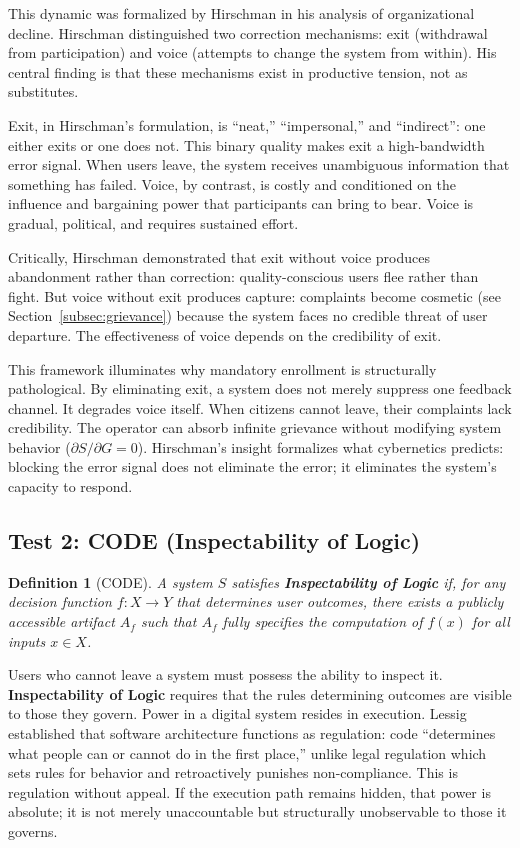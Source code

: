 \documentclass{article}
\newtheorem{definition}{Definition}[section]
\begin{document}
This dynamic was formalized by Hirschman \citep{hirschman1970} in his analysis of organizational decline. Hirschman distinguished two correction mechanisms: exit (withdrawal from participation) and voice (attempts to change the system from within). His central finding is that these mechanisms exist in productive tension, not as substitutes.

Exit, in Hirschman's formulation, is ``neat,'' ``impersonal,'' and ``indirect'': one either exits or one does not. This binary quality makes exit a high-bandwidth error signal. When users leave, the system receives unambiguous information that something has failed. Voice, by contrast, is costly and conditioned on the influence and bargaining power that participants can bring to bear. Voice is gradual, political, and requires sustained effort.

Critically, Hirschman demonstrated that exit without voice produces abandonment rather than correction: quality-conscious users flee rather than fight. But voice without exit produces capture: complaints become cosmetic (see Section~\ref{subsec:grievance}) because the system faces no credible threat of user departure. The effectiveness of voice depends on the credibility of exit.

This framework illuminates why mandatory enrollment is structurally pathological. By eliminating exit, a system does not merely suppress one feedback channel. It degrades voice itself. When citizens cannot leave, their complaints lack credibility. The operator can absorb infinite grievance without modifying system behavior ($\partial S / \partial G = 0$). Hirschman's insight formalizes what cybernetics predicts: blocking the error signal does not eliminate the error; it eliminates the system's capacity to respond.

\subsection{Test 2: CODE (Inspectability of Logic)}

\begin{definition}[CODE]
\label{def:code}
A system $S$ satisfies \textbf{Inspectability of Logic} if, for any decision function $f: X \to Y$ that determines user outcomes, there exists a publicly accessible artifact $A_f$ such that $A_f$ fully specifies the computation of $f(x)$ for all inputs $x \in X$.
\end{definition}

Users who cannot leave a system must possess the ability to inspect it. \textbf{Inspectability of Logic} requires that the rules determining outcomes are visible to those they govern. Power in a digital system resides in execution. Lessig \citep{lessig2006} established that software architecture functions as regulation: code ``determines what people can or cannot do in the first place,'' unlike legal regulation which sets rules for behavior and retroactively punishes non-compliance. This is regulation without appeal. If the execution path remains hidden, that power is absolute; it is not merely unaccountable but structurally unobservable to those it governs.
\end{document}
